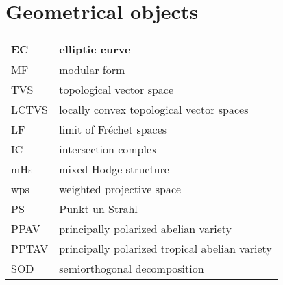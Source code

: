 \documentclass{amsart}
\numberwithin{equation}{section}
\theoremstyle{plain}
\numberwithin{equation}{section}
\theoremstyle{remark}
\begin{document}
\section{Geometrical objects}
\begin{longtable}{l|l}
\hline
EC & elliptic curve \\ \hline
MF & modular form  \\ \hline
TVS & topological vector space\\ \hline
LCTVS &  locally convex topological vector spaces\\ \hline
LF & limit of Fréchet spaces\\ \hline
IC & intersection complex\\ \hline
mHs & mixed Hodge structure\\ \hline
wps & weighted projective space\\ \hline
PS & Punkt un Strahl\\ \hline
PPAV & principally polarized abelian variety\\ \hline
PPTAV & principally polarized tropical abelian variety\\ \hline
SOD & semiorthogonal decomposition\\ \hline
\end{longtable}
\end{document}
